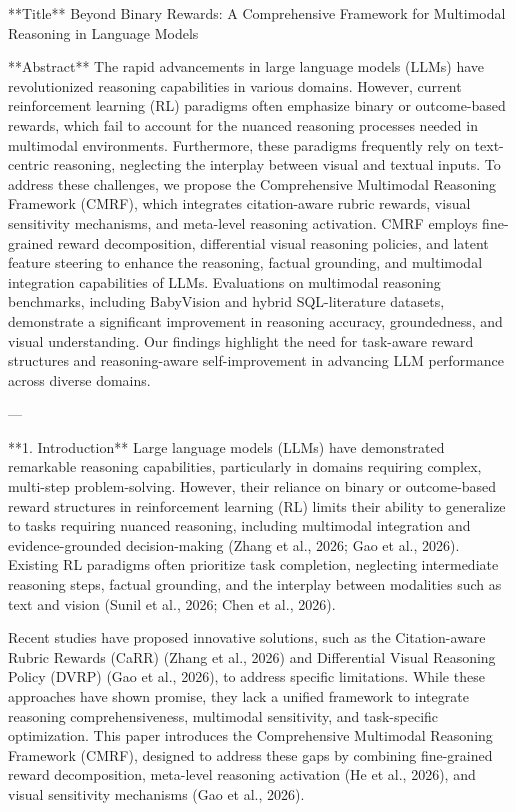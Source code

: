 **Title**  
Beyond Binary Rewards: A Comprehensive Framework for Multimodal Reasoning in Language Models  

**Abstract**  
The rapid advancements in large language models (LLMs) have revolutionized reasoning capabilities in various domains. However, current reinforcement learning (RL) paradigms often emphasize binary or outcome-based rewards, which fail to account for the nuanced reasoning processes needed in multimodal environments. Furthermore, these paradigms frequently rely on text-centric reasoning, neglecting the interplay between visual and textual inputs. To address these challenges, we propose the Comprehensive Multimodal Reasoning Framework (CMRF), which integrates citation-aware rubric rewards, visual sensitivity mechanisms, and meta-level reasoning activation. CMRF employs fine-grained reward decomposition, differential visual reasoning policies, and latent feature steering to enhance the reasoning, factual grounding, and multimodal integration capabilities of LLMs. Evaluations on multimodal reasoning benchmarks, including BabyVision and hybrid SQL-literature datasets, demonstrate a significant improvement in reasoning accuracy, groundedness, and visual understanding. Our findings highlight the need for task-aware reward structures and reasoning-aware self-improvement in advancing LLM performance across diverse domains.  

---

**1. Introduction**  
Large language models (LLMs) have demonstrated remarkable reasoning capabilities, particularly in domains requiring complex, multi-step problem-solving. However, their reliance on binary or outcome-based reward structures in reinforcement learning (RL) limits their ability to generalize to tasks requiring nuanced reasoning, including multimodal integration and evidence-grounded decision-making (Zhang et al., 2026; Gao et al., 2026). Existing RL paradigms often prioritize task completion, neglecting intermediate reasoning steps, factual grounding, and the interplay between modalities such as text and vision (Sunil et al., 2026; Chen et al., 2026).  

Recent studies have proposed innovative solutions, such as the Citation-aware Rubric Rewards (CaRR) (Zhang et al., 2026) and Differential Visual Reasoning Policy (DVRP) (Gao et al., 2026), to address specific limitations. While these approaches have shown promise, they lack a unified framework to integrate reasoning comprehensiveness, multimodal sensitivity, and task-specific optimization. This paper introduces the Comprehensive Multimodal Reasoning Framework (CMRF), designed to address these gaps by combining fine-grained reward decomposition, meta-level reasoning activation (He et al., 2026), and visual sensitivity mechanisms (Gao et al., 2026).  

